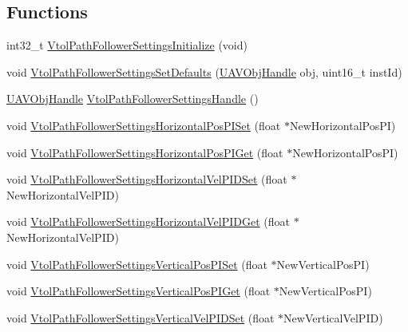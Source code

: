 \subsection*{\-Functions}
\begin{DoxyCompactItemize}
\item 
int32\-\_\-t \hyperlink{group___vtol_path_follower_settings_ga9d903a729969ef050c388adef03027e9}{\-Vtol\-Path\-Follower\-Settings\-Initialize} (void)
\item 
void \hyperlink{group___vtol_path_follower_settings_gaa731707e62b74b654e18a1353f7537f7}{\-Vtol\-Path\-Follower\-Settings\-Set\-Defaults} (\hyperlink{targets_2_u_a_v_objects_2inc_2uavobjectmanager_8h_a279053e22be53ce9f895043aaeb91e3b}{\-U\-A\-V\-Obj\-Handle} obj, uint16\-\_\-t inst\-Id)
\item 
\hyperlink{targets_2_u_a_v_objects_2inc_2uavobjectmanager_8h_a279053e22be53ce9f895043aaeb91e3b}{\-U\-A\-V\-Obj\-Handle} \hyperlink{group___vtol_path_follower_settings_ga23e7982bc8ffdec588a01f4be54e9961}{\-Vtol\-Path\-Follower\-Settings\-Handle} ()
\item 
void \hyperlink{group___vtol_path_follower_settings_ga0fb3120eea91aaec6702dad092afcf0d}{\-Vtol\-Path\-Follower\-Settings\-Horizontal\-Pos\-P\-I\-Set} (float $\ast$\-New\-Horizontal\-Pos\-P\-I)
\item 
void \hyperlink{group___vtol_path_follower_settings_ga20d913907699127d812d8b307f9e290a}{\-Vtol\-Path\-Follower\-Settings\-Horizontal\-Pos\-P\-I\-Get} (float $\ast$\-New\-Horizontal\-Pos\-P\-I)
\item 
void \hyperlink{group___vtol_path_follower_settings_ga699f6fa4ef4cfb9a7089d26a9ec15b46}{\-Vtol\-Path\-Follower\-Settings\-Horizontal\-Vel\-P\-I\-D\-Set} (float $\ast$\-New\-Horizontal\-Vel\-P\-I\-D)
\item 
void \hyperlink{group___vtol_path_follower_settings_ga94a7b3a7707fcf04f3e47b4db5968916}{\-Vtol\-Path\-Follower\-Settings\-Horizontal\-Vel\-P\-I\-D\-Get} (float $\ast$\-New\-Horizontal\-Vel\-P\-I\-D)
\item 
void \hyperlink{group___vtol_path_follower_settings_gae5cb7b6fd1bec2bf0dae234694e8b0de}{\-Vtol\-Path\-Follower\-Settings\-Vertical\-Pos\-P\-I\-Set} (float $\ast$\-New\-Vertical\-Pos\-P\-I)
\item 
void \hyperlink{group___vtol_path_follower_settings_ga3bc9aba399cffe6e4960e0110686c971}{\-Vtol\-Path\-Follower\-Settings\-Vertical\-Pos\-P\-I\-Get} (float $\ast$\-New\-Vertical\-Pos\-P\-I)
\item 
void \hyperlink{group___vtol_path_follower_settings_gaf82b461fb1e2767e061d0912f5f59cb5}{\-Vtol\-Path\-Follower\-Settings\-Vertical\-Vel\-P\-I\-D\-Set} (float $\ast$\-New\-Vertical\-Vel\-P\-I\-D)

\end{DoxyCompactItemize}
